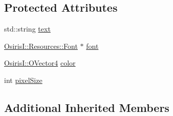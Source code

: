 \subsection*{Protected Attributes}
\begin{DoxyCompactItemize}
\item 
std\-::string \hyperlink{class_osiris_i_1_1_graphics_1_1_actors_1_1_i_text_ac61379d2b25119354434d62ba327d882}{text}
\item 
\hyperlink{class_osiris_i_1_1_resources_1_1_font}{Osiris\-I\-::\-Resources\-::\-Font} $\ast$ \hyperlink{class_osiris_i_1_1_graphics_1_1_actors_1_1_i_text_ad9be58200771fdb8948651288b416c9c}{font}
\item 
\hyperlink{struct_osiris_i_1_1_o_vector4}{Osiris\-I\-::\-O\-Vector4} \hyperlink{class_osiris_i_1_1_graphics_1_1_actors_1_1_i_text_a2d353e301a379540fd86d549911e8001}{color}
\item 
int \hyperlink{class_osiris_i_1_1_graphics_1_1_actors_1_1_i_text_a8baca06465fbfd2e2560cc00c04a483a}{pixel\-Size}
\end{DoxyCompactItemize}
\subsection*{Additional Inherited Members}


